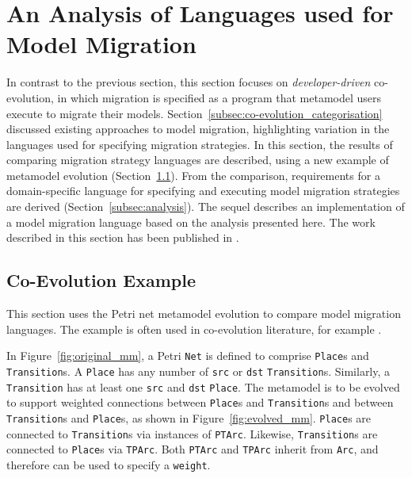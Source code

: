 
\section[An Analysis of Languages used for Model Migration][An Analysis of Model Migration Languages]{An Analysis of Languages used for Model Migration}
\label{sec:analyis_of_languages_used_for_migration}
In contrast to the previous section, this section focuses on \emph{developer-driven} co-evolution, in which migration is specified as a program that metamodel users execute to migrate their models. Section~\ref{subsec:co-evolution_categorisation} discussed existing approaches to model migration, highlighting variation in the languages used for specifying migration strategies. In this section, the results of comparing migration strategy languages are described, using a new example of metamodel evolution (Section~\ref{subsec:co-evo_example}). From the comparison, requirements for a domain-specific language for specifying and executing model migration strategies are derived (Section~\ref{subsec:analysis}). The sequel describes an implementation of a model migration language based on the analysis presented here. The work described in this section has been published in \cite{rose10flock}.

\subsection{Co-Evolution Example}
\label{subsec:co-evo_example}
This section uses the Petri net metamodel evolution to compare model migration languages. The example is often used in co-evolution literature, for example \cite{cicchetti08automating,garces09managing,wachsmuth07metamodel}.

In Figure~\ref{fig:original_mm}, a Petri \texttt{Net} is defined to comprise \texttt{Pl\-a\-ce}s and \texttt{Tr\-an\-si\-ti\-on}s. A \texttt{Pl\-a\-ce} has any number of \texttt{src} or \texttt{dst} \texttt{Tr\-an\-si\-ti\-on}s. Similarly, a \texttt{Tr\-an\-si\-ti\-on} has at least one \texttt{src} and \texttt{dst} \texttt{Pl\-a\-ce}. The metamodel is to be evolved to support weighted connections between \texttt{Pl\-a\-ce}s and \texttt{Tr\-an\-si\-ti\-on}s and between \texttt{Tr\-an\-si\-ti\-on}s and \texttt{Pl\-a\-ce}s, as shown in Figure~\ref{fig:evolved_mm}. \texttt{Pl\-a\-ce}s are connected to \texttt{Tr\-an\-si\-ti\-on}s via instances of \texttt{PTArc}. Likewise, \texttt{Tr\-an\-si\-ti\-on}s are connected to \texttt{Pl\-a\-ce}s via \texttt{TPArc}. Both \texttt{PTArc} and \texttt{TPArc} inherit from \texttt{Arc}, and therefore can be used to specify a \texttt{we\-ig\-ht}.


